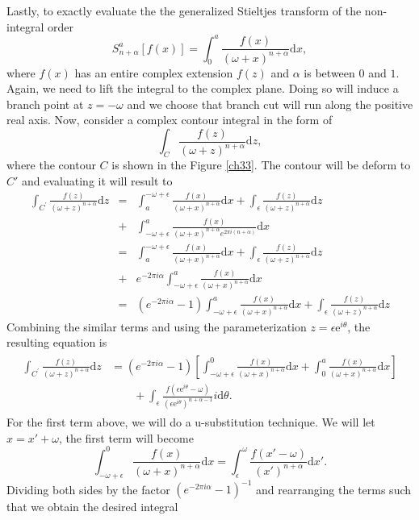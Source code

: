 Lastly, to exactly evaluate the the generalized Stieltjes transform of the non-integral order
\begin{equation}\label{pf}
	S_{n+\alpha}^{a}[f(x)] = \int_{0}^{a}\frac{f(x)}{(\omega+x)^{n+\alpha}}\mathrm{d}x, 
\end{equation}
where $f(x)$ has an entire complex extension $f(z)$ and $\alpha$ is between $0$ and $1$. Again, we need to lift the integral to the complex plane. Doing so will induce a branch point at $z=-\omega$ and we choose that branch cut will run along the positive real axis. Now, consider a complex contour integral in the form of 
\begin{equation}
     \int_{C} \frac{f(z)}{(\omega + z)^{n+\alpha}} \mathrm{d}z ,
\end{equation}
where the contour $C$ is shown in the Figure \ref{ch33}. The contour will be deform to $C'$ and evaluating it will result to
\begin{eqnarray}\label{3.81}
\int_{C^\prime}\frac{f(z)}{(\omega+z)^{n+\alpha}}\mathrm{d}z&=&\int_a^{-\omega+\epsilon}\frac{f(x)}{(\omega+x)^{n+\alpha}}\mathrm{d}x + \int_{\epsilon}\frac{f(z)}{(\omega+z)^{n+\alpha}}\mathrm{d}z\nonumber\\\nonumber
&+&\int_{-\omega+\epsilon}^a\frac{f(x)}{(\omega+x)^{n+\alpha}e^{2\pi i(n+\alpha)}}\mathrm{d}x\\
&=&\int_a^{-\omega+\epsilon}\frac{f(x)}{(\omega+x)^{n+\alpha}}\mathrm{d}x+\int_{\epsilon}\frac{f(z)}{(\omega+z)^{n+\alpha}}\mathrm{d}z\\
 \quad & +&e^{-2\pi i\alpha}\int_{-\omega+\epsilon}^a\frac{f(x)}{(\omega+x)^{n+\alpha}}\mathrm{d}x\nonumber \\
&=&(e^{-2\pi i\alpha}-1)\int_{-\omega+\epsilon}^a\frac{f(x)}{(\omega+x)^{n+\alpha}}\mathrm{d}x+\int_{\epsilon}\frac{f(z)}{(\omega+z)^{n+\alpha}}\mathrm{d}z \nonumber
\end{eqnarray}
Combining the similar terms and using the parameterization $z = \epsilon\mathrm{e}^{i\theta}$, the resulting equation is
\begin{align}
\begin{split}
  \int_{C^\prime}\frac{f(z)}{(\omega+z)^{n+\alpha}}\mathrm{d}z &= (e^{-2\pi i\alpha}-1)\left [\int_{-\omega+\epsilon}^{0}\frac{f(x)}{(\omega+x)^{n+\alpha}}\mathrm{d}x+\int_{0}^{a}\frac{f(x)}{(\omega+x)^{n+\alpha}}\mathrm{d}x\right ]\\& \qquad +\int_{\epsilon}\frac{f(\epsilon \mathrm{e}^{i\theta} - \omega)}{(\epsilon \mathrm{e}^{i\theta})^{n+\alpha-1}}i\mathrm{d}\theta.
\end{split}
\end{align}
For the first term above, we will do a u-substitution technique. We will let $x = x' + \omega$, the first term will become
\begin{equation}
    \int_{-\omega+\epsilon}^{0}\frac{f(x)}{(\omega+x)^{n+\alpha}}\mathrm{d}x = \int_{\epsilon}^{\omega}\frac{f(x' - \omega)}{(x')^{n+\alpha}}\mathrm{d}x'.
\end{equation}
Dividing both sides by the factor $(e^{-2\pi i\alpha}-1)^{-1}$ and rearranging the terms such that we obtain the desired integral

